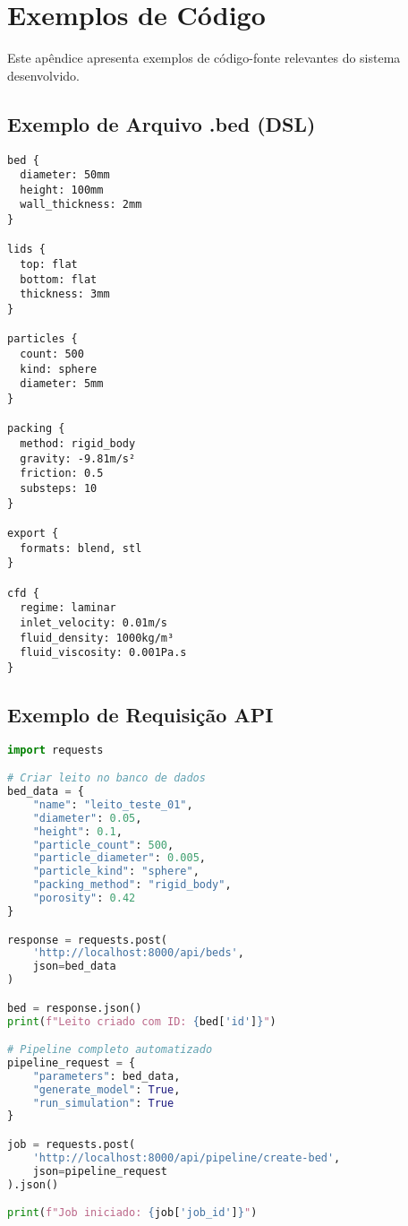 \chapter{Exemplos de Código}
\label{ap:codigo}

Este apêndice apresenta exemplos de código-fonte relevantes do sistema desenvolvido.

\section{Exemplo de Arquivo .bed (DSL)}

\begin{lstlisting}[caption={Exemplo de especificação de leito empacotado na DSL}]
bed {
  diameter: 50mm
  height: 100mm
  wall_thickness: 2mm
}

lids {
  top: flat
  bottom: flat
  thickness: 3mm
}

particles {
  count: 500
  kind: sphere
  diameter: 5mm
}

packing {
  method: rigid_body
  gravity: -9.81m/s²
  friction: 0.5
  substeps: 10
}

export {
  formats: blend, stl
}

cfd {
  regime: laminar
  inlet_velocity: 0.01m/s
  fluid_density: 1000kg/m³
  fluid_viscosity: 0.001Pa.s
}
\end{lstlisting}

\section{Exemplo de Requisição API}

\begin{lstlisting}[language=Python, caption={Exemplo de uso da API REST}]
import requests

# Criar leito no banco de dados
bed_data = {
    "name": "leito_teste_01",
    "diameter": 0.05,
    "height": 0.1,
    "particle_count": 500,
    "particle_diameter": 0.005,
    "particle_kind": "sphere",
    "packing_method": "rigid_body",
    "porosity": 0.42
}

response = requests.post(
    'http://localhost:8000/api/beds', 
    json=bed_data
)

bed = response.json()
print(f"Leito criado com ID: {bed['id']}")

# Pipeline completo automatizado
pipeline_request = {
    "parameters": bed_data,
    "generate_model": True,
    "run_simulation": True
}

job = requests.post(
    'http://localhost:8000/api/pipeline/create-bed',
    json=pipeline_request
).json()

print(f"Job iniciado: {job['job_id']}")
\end{lstlisting}

